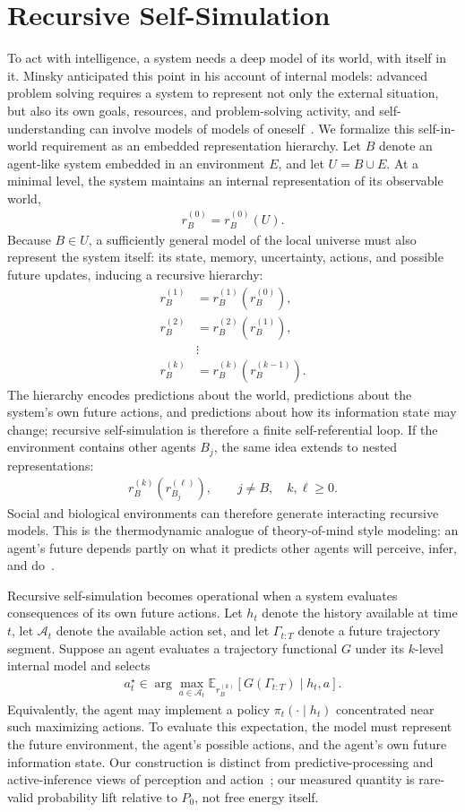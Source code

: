 \documentclass[
  aps,
  prresearch,
  reprint,
  amsmath,
  amssymb,
  superscriptaddress,
  nofootinbib,
  longbibliography
]{revtex4-2}
\def\EQSP{3pt}
\newcommand{\cgather}[2][\EQSP]{\begingroup\setlength\abovedisplayskip{#1}\setlength\belowdisplayskip{#1}\begin{gather} #2 \end{gather}\endgroup\noindent}
\newcommand{\calign}[2][\EQSP]{\begingroup\setlength\abovedisplayskip{#1}\setlength\belowdisplayskip{#1}\begin{align} #2 \end{align}\endgroup\noindent}
\newcommand{\Exp}{\mathbb{E}}
\begin{document}
\section{Recursive Self-Simulation}
\label{sec:selfmodeling}

To act with intelligence, a system needs a deep model of its world, with itself in it. Minsky anticipated this point in his account of internal models: advanced problem solving requires a system to represent not only the external situation, but also its own goals, resources, and problem-solving activity, and self-understanding can involve models of models of oneself~\citep{minsky1965matter,minsky1986society,minsky2006emotion}. We formalize this self-in-world requirement as an embedded representation hierarchy. Let \(B\) denote an agent-like system embedded in an environment \(E\), and let \(U=B\cup E\). At a minimal level, the system maintains an internal representation of its observable world,
\cgather{
    r_B^{(0)}=r_B^{(0)}(U).
}
Because \(B\in U\), a sufficiently general model of the local universe must also represent the system itself: its state, memory, uncertainty, actions, and possible future updates, inducing a recursive hierarchy:
\calign{
    r_B^{(1)} &= r_B^{(1)}(r_B^{(0)}),\\
    r_B^{(2)} &= r_B^{(2)}(r_B^{(1)}),\\
    &\vdots \nonumber\\
    r_B^{(k)} &= r_B^{(k)}(r_B^{(k-1)}).
}
The hierarchy encodes predictions about the world, predictions about the system's own future actions, and predictions about how its information state may change; recursive self-simulation is therefore a finite self-referential loop. If the environment contains other agents \(B_j\), the same idea extends to nested representations:
\cgather{
    r_B^{(k)}\!\left(r_{B_j}^{(\ell)}\right),
    \qquad j\neq B,\quad k,\ell\geq0.
}%
Social and biological environments can therefore generate interacting recursive models. This is the thermodynamic analogue of theory-of-mind style modeling: an agent's future depends partly on what it predicts other agents will perceive, infer, and do~\citep{premack1978chimpanzee,dennett1987intentional}.

Recursive self-simulation becomes operational when a system evaluates consequences of its own future actions. Let \(h_t\) denote the history available at time \(t\), let \(\mathcal A_t\) denote the available action set, and let \(\Gamma_{t:T}\) denote a future trajectory segment. Suppose an agent evaluates a trajectory functional \(G\) under its \(k\)-level internal model and selects
\cgather{
    a_t^\star
    \in
    \arg\max_{a\in\mathcal A_t}
    \Exp_{r_B^{(k)}}\!\left[
    G(\Gamma_{t:T})\mid h_t,a
    \right].
    \label{eq:recursive_action_choice}
}%
Equivalently, the agent may implement a policy \(\pi_t(\cdot\mid h_t)\) concentrated near such maximizing actions. To evaluate this expectation, the model must represent the future environment, the agent's possible actions, and the agent's own future information state. Our construction is distinct from predictive-processing and active-inference views of perception and action~\citep{friston2010free}; our measured quantity is rare-valid probability lift relative to \(P_0\), not free energy itself.
\end{document}
